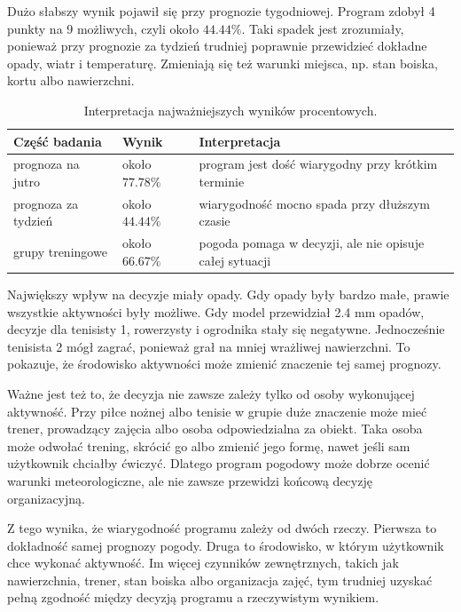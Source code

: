 \documentclass[a4paper,12pt]{article}
\begin{document}
\noindent
Dużo słabszy wynik pojawił się przy prognozie tygodniowej. Program zdobył 4
punkty na 9 możliwych, czyli około $44.44\%$. Taki spadek jest zrozumiały,
ponieważ przy prognozie za tydzień trudniej poprawnie przewidzieć dokładne
opady, wiatr i temperaturę. Zmieniają się też warunki miejsca, np. stan boiska,
kortu albo nawierzchni.

\begin{table}[H]
\centering
\small
\begin{tabular}{p{4.0cm}p{3.0cm}p{5.5cm}}
\toprule
\textbf{Część badania} & \textbf{Wynik} & \textbf{Interpretacja} \\
\midrule
prognoza na jutro & około $77.78\%$ & program jest dość wiarygodny przy krótkim terminie \\[12pt]
prognoza za tydzień & około $44.44\%$ & wiarygodność mocno spada przy dłuższym czasie \\[12pt]
grupy treningowe & około $66.67\%$ & pogoda pomaga w decyzji, ale nie opisuje całej sytuacji \\
\bottomrule
\end{tabular}
\caption{Interpretacja najważniejszych wyników procentowych.}
\end{table}

\noindent
Największy wpływ na decyzje miały opady. Gdy opady były bardzo małe, prawie
wszystkie aktywności były możliwe. Gdy model przewidział 2.4 mm opadów, decyzje
dla tenisisty 1, rowerzysty i ogrodnika stały się negatywne. Jednocześnie
tenisista 2 mógł zagrać, ponieważ grał na mniej wrażliwej nawierzchni. To
pokazuje, że środowisko aktywności może zmienić znaczenie tej samej prognozy.

\noindent
Ważne jest też to, że decyzja nie zawsze zależy tylko od osoby wykonującej
aktywność. Przy piłce nożnej albo tenisie w grupie duże znaczenie może mieć
trener, prowadzący zajęcia albo osoba odpowiedzialna za obiekt. Taka osoba może
odwołać trening, skrócić go albo zmienić jego formę, nawet jeśli sam użytkownik
chciałby ćwiczyć. Dlatego program pogodowy może dobrze ocenić warunki
meteorologiczne, ale nie zawsze przewidzi końcową decyzję organizacyjną.

\noindent
Z tego wynika, że wiarygodność programu zależy od dwóch rzeczy. Pierwsza to
dokładność samej prognozy pogody. Druga to środowisko, w którym użytkownik chce
wykonać aktywność. Im więcej czynników zewnętrznych, takich jak nawierzchnia,
trener, stan boiska albo organizacja zajęć, tym trudniej uzyskać pełną zgodność
między decyzją programu a rzeczywistym wynikiem.
\end{document}
